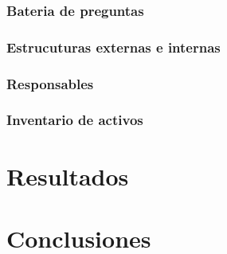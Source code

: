 \documentclass[a4paper, 10pt]{article}
\begin{document}
\subsubsection*{Bateria de preguntas}
\subsubsection*{Estrucuturas externas e internas}
\subsubsection*{Responsables}

\subsubsection*{Inventario de activos}




\clearpage

\section{Resultados}



\clearpage

\section{Conclusiones}



\clearpage
\end{document}
